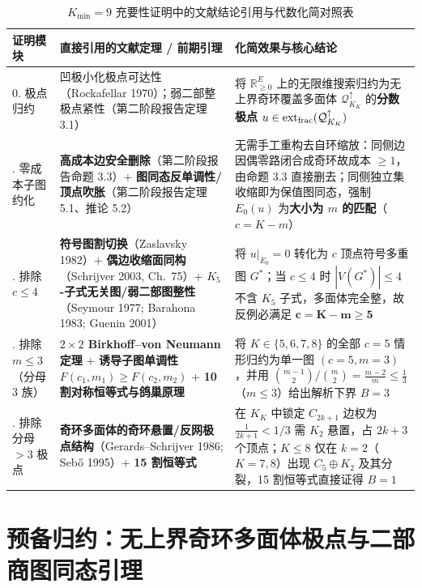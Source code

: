 \documentclass[11pt,a4paper]{ctexart}
\theoremstyle{definition}
\newcommand{\RR}{\mathbb R}
\newcommand{\1}{\boldsymbol 1}
\newcommand{\0}{\boldsymbol 0}
\begin{document}
\begin{table}[htbp]
\centering
\small
\caption{$K_{\min}=9$ 充要性证明中的文献结论引用与代数化简对照表}\label{tab:simplification}
\vspace{1mm}
\begin{tabularx}{\linewidth}{@{}p{.24\linewidth}p{.34\linewidth}X@{}}
\toprule
证明模块 & 直接引用的文献定理 / 前期引理 & 化简效果与核心结论 \\
\midrule
0. 极点归约 & 凹极小化极点可达性（Rockafellar 1970）；弱二部整极点紧性（第二阶段报告定理 3.1） & 将 $\RR_{\ge 0}^E$ 上的无限维搜索归约为无上界奇环覆盖多面体 $\mathcal Q_{K_K}^{\uparrow}$ 的\textbf{分数极点} $u\in\operatorname{ext}_{\rm frac}(\mathcal Q_{K_K}^{\uparrow})$ \\
\addlinespace[3pt]
1. 零成本子图约化 & \textbf{高成本边安全删除}（第二阶段报告命题 3.3）+ \textbf{图同态反单调性/顶点吹胀}（第二阶段报告定理 5.1、推论 5.2） & 无需手工重构去自环缩放：同侧边因偶零路闭合成奇环故成本 $\ge 1$，由命题 3.3 直接删去；同侧独立集收缩即为保值图同态，强制 $E_0(u)$ 为\textbf{大小为 $m$ 的匹配}（$c=K-m$） \\
\addlinespace[3pt]
2. 排除 $c\le 4$ & \textbf{符号图割切换}（Zaslavsky 1982）+ \textbf{偶边收缩面同构}（Schrijver 2003, Ch.\ 75）+ \textbf{$K_5$-子式无关图/弱二部图整性}（Seymour 1977; Barahona 1983; Guenin 2001） & 将 $u|_{E_0}=0$ 转化为 $c$ 顶点符号多重图 $G^*$；当 $c\le 4$ 时 $|V(G^*)|\le 4$ 不含 $K_5$ 子式，多面体完全整，故反例必满足 $\bm{c=K-m\ge 5}$ \\
\addlinespace[3pt]
3. 排除 $m\le 3$（分母 3 族） & \textbf{$2\times 2$ Birkhoff--von Neumann 定理} + \textbf{诱导子图单调性} $F(c_1,m_1)\ge F(c_2,m_2)$ + \textbf{10 割对称恒等式与鸽巢原理} & 将 $K\in\{5,6,7,8\}$ 的全部 $c=5$ 情形归约为单一图 $(c=5,m=3)$，并用 $\binom{m-1}{2}/\binom{m}{2}=\frac{m-2}{m}\le\frac{1}{3}$（$m\le 3$）给出解析下界 $B=3$ \\
\addlinespace[3pt]
4. 排除分母 $>3$ 极点 & \textbf{奇环多面体的奇环悬置/反网极点结构}（Gerards--Schrijver 1986; Seb\H{o} 1995）+ \textbf{15 割恒等式} & 在 $K_K$ 中锁定 $C_{2k+1}$ 边权为 $\frac{1}{2k+1}<1/3$ 需 $K_2$ 悬置，占 $2k+3$ 个顶点；$K\le 8$ 仅在 $k=2$（$K=7,8$）出现 $C_5\oplus K_2$ 及其分裂，15 割恒等式直接证得 $B=1$ \\
\bottomrule
\end{tabularx}
\end{table}

\section{预备归约：无上界奇环多面体极点与二部商图同态引理}
\end{document}
